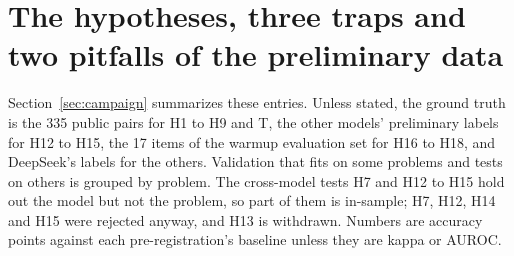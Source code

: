 \section{The hypotheses, three traps and two pitfalls of the preliminary data}\label{app:A}

Section~\ref{sec:campaign} summarizes these entries. Unless stated, the ground truth is the 335 public pairs for H1 to H9 and T, the other models' preliminary labels for H12 to H15, the 17 items of the warmup evaluation set for H16 to H18, and DeepSeek's labels for the others. Validation that fits on some problems and tests on others is grouped by problem. The cross-model tests H7 and H12 to H15 hold out the model but not the problem, so part of them is in-sample; H7, H12, H14 and H15 were rejected anyway, and H13 is withdrawn. Numbers are accuracy points against each pre-registration's baseline unless they are kappa or AUROC.


